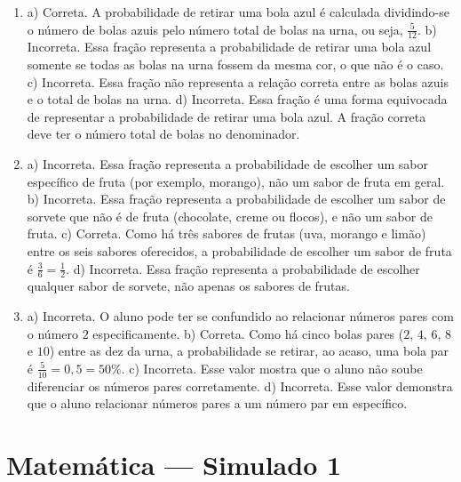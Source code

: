 \begin{enumerate}
\item a) Correta. A probabilidade de retirar uma bola azul é calculada dividindo-se o número de bolas azuis pelo número total de bolas na urna, ou seja, $\frac{5}{12}$.
b) Incorreta. Essa fração representa a probabilidade de retirar uma bola azul somente se todas as bolas na urna fossem da mesma cor, o que não é o caso.
c) Incorreta. Essa fração não representa a relação correta entre as bolas azuis e o total de bolas na urna.
d) Incorreta. Essa fração é uma forma equivocada de representar a probabilidade de retirar uma bola azul. A fração correta deve ter o número total de bolas no denominador.
\item a) Incorreta. Essa fração representa a probabilidade de escolher um sabor específico de fruta (por exemplo, morango), não um sabor de fruta em geral.
b) Incorreta. Essa fração representa a probabilidade de escolher um sabor de sorvete que não é de fruta (chocolate, creme ou flocos), e não um sabor de fruta.
c) Correta. Como há três sabores de frutas (uva, morango e limão) entre os seis sabores oferecidos, a probabilidade de escolher um sabor de fruta é $\frac{3}{6} = \frac{1}{2}$.
d) Incorreta. Essa fração representa a probabilidade de escolher qualquer sabor de sorvete, não apenas os sabores de frutas.
\item a) Incorreta. O aluno pode ter se confundido ao relacionar números pares com o número $2$ especificamente.
b) Correta. Como há cinco bolas pares ($2$, $4$, $6$, $8$ e $10$) entre as dez da urna, a probabilidade se retirar, ao acaso, uma bola par é $\frac{5}{10} = 0,5 = 50\%$.
c) Incorreta. Esse valor mostra que o aluno não soube diferenciar os números pares corretamente.
d) Incorreta. Esse valor demonstra que o aluno relacionar números pares a um número par em específico.
\end{enumerate}

\section*{Matemática — Simulado 1}

